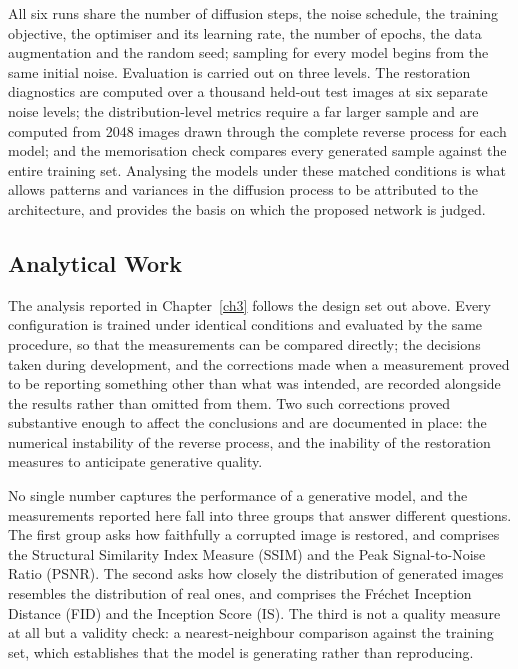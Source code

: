 All six runs share the number of diffusion steps, the noise schedule, the training objective, the
optimiser and its learning rate, the number of epochs, the data augmentation and the random seed;
sampling for every model begins from the same initial noise. Evaluation is carried out on three
levels. The restoration diagnostics are computed over a thousand held-out test images at six
separate noise levels; the distribution-level metrics require a far larger sample and are computed
from 2048 images drawn through the complete reverse process for each model; and the memorisation
check compares every generated sample against the entire training set. Analysing the models under
these matched conditions is what allows patterns and variances in the diffusion process to be
attributed to the architecture, and provides the basis on which the proposed network is judged.

\subsection{Analytical Work}

The analysis reported in Chapter~\ref{ch3} follows the design set out above. Every configuration is
trained under identical conditions and evaluated by the same procedure, so that the measurements can
be compared directly; the decisions taken during development, and the corrections made when a
measurement proved to be reporting something other than what was intended, are recorded alongside
the results rather than omitted from them. Two such corrections proved substantive enough to affect
the conclusions and are documented in place: the numerical instability of the reverse process, and
the inability of the restoration measures to anticipate generative quality.

No single number captures the performance of a generative model, and the measurements reported here
fall into three groups that answer different questions. The first group asks how faithfully a
corrupted image is restored, and comprises the Structural Similarity Index Measure (SSIM) and the
Peak Signal-to-Noise Ratio (PSNR). The second asks how closely the distribution of generated images
resembles the distribution of real ones, and comprises the Fr\'echet Inception Distance (FID) and
the Inception Score (IS). The third is not a quality measure at all but a validity check: a
nearest-neighbour comparison against the training set, which establishes that the model is
generating rather than reproducing.

